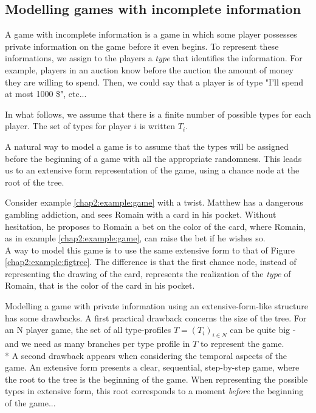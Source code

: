 \subsection{Modelling games with incomplete information}

A game with incomplete information is a game in which some player possesses private information on the game before it even begins. To represent these  informations, we assign to the players a \emph{type} that identifies the information. For example, players in an auction know before the auction the amount of money they are willing to spend. Then, we could say that a player is of type "I'll spend at most 1000 \$", etc...

 In what follows, we assume that there is a finite number of possible types for each player. The set of types for player $i$ is written $T_i$.

A natural way to model a game is to assume that the types will be assigned before the beginning of a game with all the appropriate randomness. This leads us to an extensive form representation of the game, using a chance node at the root of the tree.
\begin{example}
Consider example \ref{chap2:example:game} with a twist. Matthew has a dangerous gambling addiction, and sees Romain with a card in his pocket.  Without hesitation, he proposes to Romain a bet on the color of the card, where Romain, as in example \ref{chap2:example:game}, can raise the bet if he wishes so.\\
A way to model this game is to use the same extensive form to that of Figure \ref{chap2:example:figtree}. The difference is that the first chance node, instead of representing the drawing of the card, represents the realization of the \emph{type} of Romain, that is the color of the card in his pocket.
\label{ch2:exbayintro}
\end{example}

Modelling a game with private information using an extensive-form-like structure has some drawbacks. 
A first practical drawback concerns the size of the tree. For an N player game, the set of all type-profiles $T = (T_i)_{i \in N}$ can be quite big - and we need as many branches per type profile in $T$ to represent the game. \\*
A second drawback appears when considering the temporal aspects of the game.
An extensive form presents a clear, sequential, step-by-step game, where the root to the tree is the beginning of the game. When representing the possible types in extensive form, this root corresponds to a moment \emph{before} the beginning of the game...

